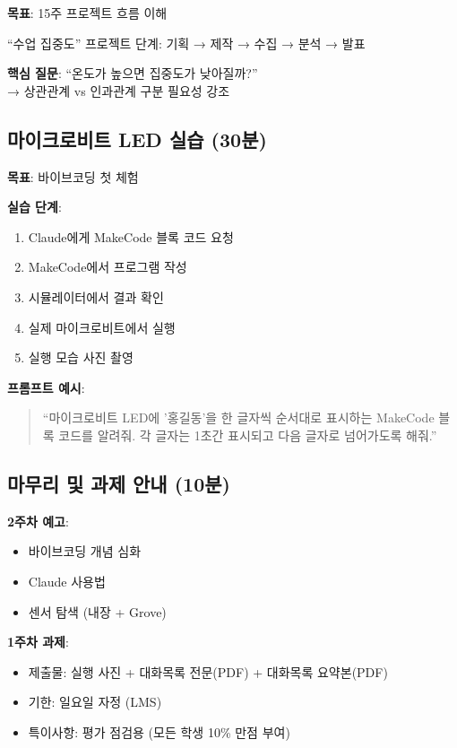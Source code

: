 \documentclass[11pt, a4paper]{article}
\begin{document}
\textbf{목표}: 15주 프로젝트 흐름 이해

``수업 집중도'' 프로젝트 단계: 기획 → 제작 → 수집 → 분석 → 발표

\begin{info}
\textbf{핵심 질문}: ``온도가 높으면 집중도가 낮아질까?''\\
→ 상관관계 vs 인과관계 구분 필요성 강조
\end{info}

\subsection{마이크로비트 LED 실습 (30분)}

\textbf{목표}: 바이브코딩 첫 체험

\begin{activity}
\textbf{실습 단계}:
\begin{enumerate}
    \item Claude에게 MakeCode 블록 코드 요청
    \item MakeCode에서 프로그램 작성
    \item 시뮬레이터에서 결과 확인
    \item 실제 마이크로비트에서 실행
    \item 실행 모습 사진 촬영
\end{enumerate}
\end{activity}

\textbf{프롬프트 예시}:
\begin{quote}
``마이크로비트 LED에 '홍길동'을 한 글자씩 순서대로 표시하는 MakeCode 블록 코드를 알려줘. 각 글자는 1초간 표시되고 다음 글자로 넘어가도록 해줘.''
\end{quote}

\subsection{마무리 및 과제 안내 (10분)}

\textbf{2주차 예고}:
\begin{itemize}
    \item 바이브코딩 개념 심화
    \item Claude 사용법
    \item 센서 탐색 (내장 + Grove)
\end{itemize}

\textbf{1주차 과제}:
\begin{itemize}
    \item 제출물: 실행 사진 + 대화목록 전문(PDF) + 대화목록 요약본(PDF)
    \item 기한: 일요일 자정 (LMS)
    \item 특이사항: 평가 점검용 (모든 학생 10\% 만점 부여)
\end{itemize}
\end{document}
